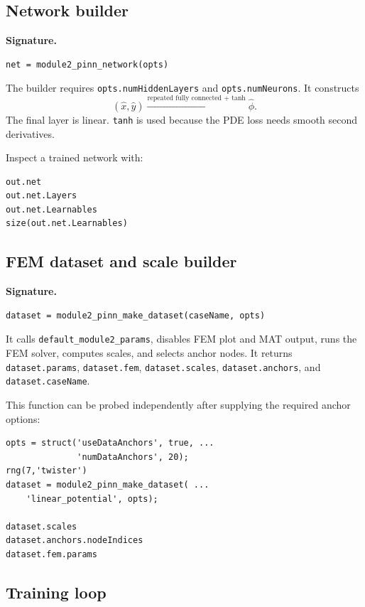 \documentclass[11pt]{article}
\begin{document}
\subsection{Network builder}

\par\smallskip\noindent\textbf{Signature.}
\begin{lstlisting}[style=projectmatlab]
net = module2_pinn_network(opts)
\end{lstlisting}
The builder requires \texttt{opts.numHiddenLayers} and \texttt{opts.numNeurons}. It constructs
\begin{equation}
(\hat{x},\hat{y})
\xrightarrow{\text{repeated fully connected + tanh}}
\hat{\phi}.
\end{equation}
The final layer is linear. \texttt{tanh} is used because the PDE loss needs smooth second derivatives.

Inspect a trained network with:
\begin{lstlisting}[style=projectmatlab]
out.net
out.net.Layers
out.net.Learnables
size(out.net.Learnables)
\end{lstlisting}

\subsection{FEM dataset and scale builder}

\par\smallskip\noindent\textbf{Signature.}
\begin{lstlisting}[style=projectmatlab]
dataset = module2_pinn_make_dataset(caseName, opts)
\end{lstlisting}
It calls \texttt{default\_module2\_params}, disables FEM plot and MAT output, runs the FEM solver, computes scales, and selects anchor nodes. It returns \texttt{dataset.params}, \texttt{dataset.fem}, \texttt{dataset.scales}, \texttt{dataset.anchors}, and \texttt{dataset.caseName}.

This function can be probed independently after supplying the required anchor options:
\begin{lstlisting}[style=projectmatlab]
opts = struct('useDataAnchors', true, ...
              'numDataAnchors', 20);
rng(7,'twister')
dataset = module2_pinn_make_dataset( ...
    'linear_potential', opts);

dataset.scales
dataset.anchors.nodeIndices
dataset.fem.params
\end{lstlisting}

\subsection{Training loop}
\end{document}
